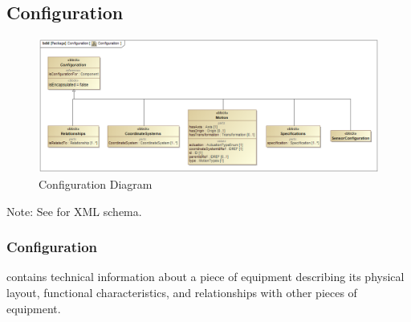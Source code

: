 \subsection{Configuration} \label{sec:Configuration}



\begin{figure}[ht]
  \centering
    \includegraphics[width=1.0\textwidth]{figures/Configuration.png}
  \caption{Configuration Diagram}
  \label{fig:Configuration Diagram}
\end{figure}

\FloatBarrier


Note: See  for XML schema.


\subsubsection{Configuration}




 contains technical information about a piece of equipment describing its physical layout, functional characteristics, and relationships with other pieces of equipment.


